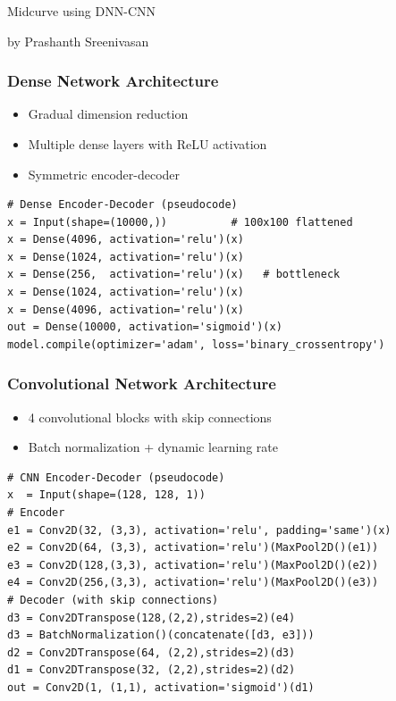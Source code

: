 \begin{frame}[fragile]\frametitle{}
\begin{center}
{\Large Midcurve using DNN-CNN}

{by Prashanth Sreenivasan}
\end{center}
\end{frame}

\begin{frame}[fragile]\frametitle{Dense Network Architecture}

	\begin{itemize}
	\item Gradual dimension reduction
	\item Multiple dense layers with ReLU activation
	\item Symmetric encoder-decoder
	\end{itemize}

\begin{lstlisting}
# Dense Encoder-Decoder (pseudocode)
x = Input(shape=(10000,))          # 100x100 flattened
x = Dense(4096, activation='relu')(x)
x = Dense(1024, activation='relu')(x)
x = Dense(256,  activation='relu')(x)   # bottleneck
x = Dense(1024, activation='relu')(x)
x = Dense(4096, activation='relu')(x)
out = Dense(10000, activation='sigmoid')(x)
model.compile(optimizer='adam', loss='binary_crossentropy')
\end{lstlisting}
\end{frame}

\begin{frame}[fragile]\frametitle{Convolutional Network Architecture}

	\begin{itemize}
	\item 4 convolutional blocks with skip connections
	\item Batch normalization + dynamic learning rate
	\end{itemize}

\begin{lstlisting}
# CNN Encoder-Decoder (pseudocode)
x  = Input(shape=(128, 128, 1))
# Encoder
e1 = Conv2D(32, (3,3), activation='relu', padding='same')(x)
e2 = Conv2D(64, (3,3), activation='relu')(MaxPool2D()(e1))
e3 = Conv2D(128,(3,3), activation='relu')(MaxPool2D()(e2))
e4 = Conv2D(256,(3,3), activation='relu')(MaxPool2D()(e3))
# Decoder (with skip connections)
d3 = Conv2DTranspose(128,(2,2),strides=2)(e4)
d3 = BatchNormalization()(concatenate([d3, e3]))
d2 = Conv2DTranspose(64, (2,2),strides=2)(d3)
d1 = Conv2DTranspose(32, (2,2),strides=2)(d2)
out = Conv2D(1, (1,1), activation='sigmoid')(d1)
\end{lstlisting}
\end{frame}

